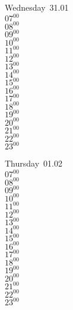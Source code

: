 \documentclass[11pt, a4paper]{book}\usepackage[]{graphicx}\usepackage[]{color}
\begin{document}
\begin{weekdaybox}
  Wednesday~31.01\\
  { 
  \vfill
  $07^{00}$\\
$08^{00}$\\
$09^{00}$\\
$10^{00}$\\
$11^{00}$\\
$12^{00}$\\
$13^{00}$\\
$14^{00}$\\
$15^{00}$\\
$16^{00}$\\
$17^{00}$\\
$18^{00}$\\
$19^{00}$\\
$20^{00}$\\
$21^{00}$\\
$22^{00}$\\
$23^{00}$\\
  }
\end{weekdaybox}
\clearpage
\begin{headerbox}
\end{headerbox}
\begin{weekdaybox}
  Thursday~01.02\\
  { 
  \vfill
  $07^{00}$\\
$08^{00}$\\
$09^{00}$\\
$10^{00}$\\
$11^{00}$\\
$12^{00}$\\
$13^{00}$\\
$14^{00}$\\
$15^{00}$\\
$16^{00}$\\
$17^{00}$\\
$18^{00}$\\
$19^{00}$\\
$20^{00}$\\
$21^{00}$\\
$22^{00}$\\
$23^{00}$\\
  }
\end{weekdaybox} 
\end{document}
